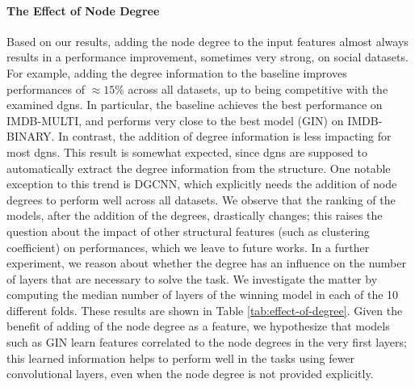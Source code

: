 

\paragraph{The Effect of Node Degree}
Based on our results, adding the node degree to the input features almost always results in a performance improvement, sometimes very strong, on social datasets. For example, adding the degree information to the baseline improves performances of $\approx 15$\% across all datasets, up to being competitive with the examined \glspl{dgn}. In particular, the baseline achieves the best performance on IMDB-MULTI, and performs very close to the best model (GIN) on IMDB-BINARY. In contrast, the addition of degree information is less impacting for most \glspl{dgn}. This result is somewhat expected, since \glspl{dgn} are supposed to automatically extract the degree information from the structure. One notable exception to this trend is DGCNN, which explicitly needs the addition of node degrees to perform well across all datasets. We observe that the ranking of the models, after the addition of the degrees, drastically changes; this raises the question about the impact of other structural features (such as clustering coefficient) on performances, which we leave to future works. In a further experiment, we reason about whether the degree has an influence on the number of layers that are necessary to solve the task. We investigate the matter by computing the median number of layers of the winning model in each of the 10 different folds. These results are shown in Table \ref{tab:effect-of-degree}. Given the benefit of adding of the node degree as a feature, we hypothesize that models such as GIN learn features correlated to the node degrees in the very first layers; this learned information helps to perform well in the tasks using fewer convolutional layers, even when the node degree is not provided explicitly.



